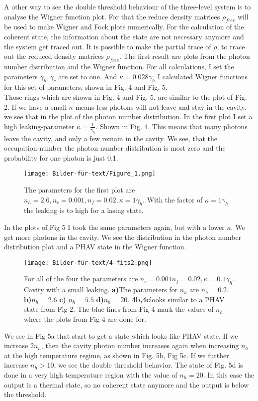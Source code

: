 \documentclass[12pt,a4paper]{article}
\begin{document}
\newpage
A other way to see the double threshold behaviour of the three-level system is to analyse the Wigner function plot. For that the reduce density matrices $\rho_{free}$ will be used to make Wigner and Fock plots numerically. For the calculation of the coherent state, the information about the state are not necessary anymore and the system get traced out. 
It is possible to make the partial trace of $\rho$, to trace out the reduced density matrices $\rho_{free}$. 
The first result are plots from the photon number distribution and the Wigner function.
 For all calculations, I set the parameters $\gamma_h, \gamma_c $ are set to one. And $\kappa=0.028 \gamma_h$
I calculated Wigner functions for this set of parameters, shown in Fig. 4 and Fig. 5.\\
Those rings which are shown in Fig. 4 and Fig. 5, are similar to the plot of Fig. 2.
If we have a small $\kappa$ means less photons will not leave and stay in the cavity. we see that in the plot of the photon number distribution.
In the first plot I set a high leaking-parameter $\kappa=\frac{1}{\gamma_h}$. Shown in Fig. 4.
This means that many photons leave the cavity, and only a few remain in the cavity. 
We see, that the occupation-number the photon number distribution is most zero and the probability for one photon is just 0.1.

\begin{figure}[hbtp]
\centering
\texttt{[image: Bilder-für-text/Figure\_1.png]}
\caption{The parameters for the first plot are $n_h=2.6, n_c=0.001, n_f=0.02, \kappa=1\gamma_h $. With  the factor of $\kappa=1\gamma_h$ the leaking is to high for a lasing state.}
\end{figure}\newpage

In the plots of Fig 5 I took the same parameters again, but with a lower $\kappa$. We get more photons in the cavity. We see the distribution in the photon number distribution plot and a PHAV state in the Wigner function. 
\begin{figure}[h!]
\centering
\texttt{[image: Bilder-für-text/4-fits2.png]}
\caption{For all of the four the parameters are $n_c=0.001 n_f=0.02,\kappa=0.1\gamma_h$. Cavity with a small leaking.
\textbf{a)}The parameters for $n_h$ are $n_h=0.2 $.
\textbf{b)}$ n_h=2.6$ 
\textbf{c)} $ n_h=5.5$ 
\textbf{d)}$ n_h=20$. 
\textbf{4b,4c}looks similar to a PHAV state from Fig 2. The blue lines from Fig 4 mark the values of $n_h$ where the plots from Fig 4 are done for. }
\end{figure}
\newpage
We see in Fig 5a that start to get a state which looks like PHAV state.
If we increase  $2n_h $,
then the cavity photon number increases again when increasing $n_h$ at the
high temperature regime, as shown in Fig. 5b, Fig 5c. 
If we further increase  $n_h >10$, we see the double threshold behavior. 
The state of Fig. 5d is done in a very high temperature region with the value of $n_h=20$. In this  case the output is a thermal state, so no coherent state anymore and the output is below the threshold.
\end{document}
